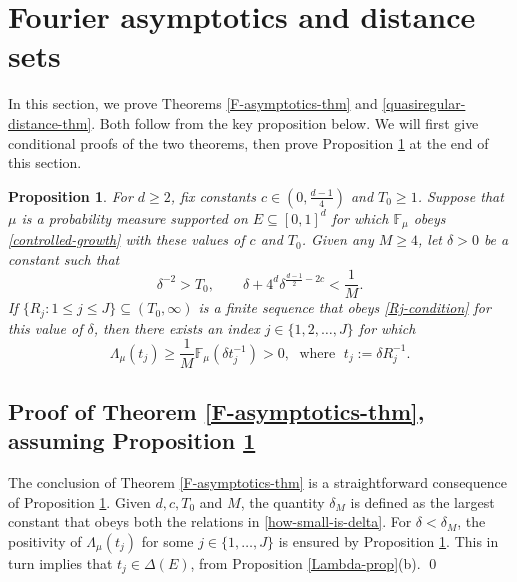 \documentclass[a4paper,11pt]{amsart}
\newtheorem{prop}[thm]{\bf Proposition}
\numberwithin{equation}{section}
\begin{document}
\section{Fourier asymptotics and distance sets} \label{F-asymptotics-section}
 In this section, we prove Theorems \ref{F-asymptotics-thm} and \ref{quasiregular-distance-thm}. Both follow from the key proposition below. We will first give conditional proofs of the two theorems, then prove Proposition \ref{F-asymptotics-prop} at the end of this section. 
\begin{prop} \label{F-asymptotics-prop} 
 For $d \geq 2$, fix constants $c \in (0, \frac{d-1}{4})$ and $T_0 \geq 1$. Suppose that $\mu$ is a probability measure supported on $E \subseteq [0,1]^d$ for which $\mathbb F_{\mu}$ obeys \eqref{controlled-growth} with these values of $c$ and $T_0$. Given any $M \geq 4$, let $\delta > 0$ be a constant such that 
\begin{equation} \label{how-small-is-delta} 
\delta^{-2} > T_0, \qquad \delta + 4^d \delta^{\frac{d-1}{2} - 2c} < \frac{1}{M}. 
\end{equation}  
If $\{R_j : 1 \leq j \leq J \} \subseteq (T_0, \infty)$ is a finite sequence that obeys \eqref{Rj-condition} for this value of $\delta$, then there exists an index $j \in \{1, 2, \ldots, J\}$  for which 
\begin{equation}
\Lambda_{\mu}(t_j) \geq \frac{1}{M} \mathbb F_{\mu}(\delta t_j^{-1}) > 0, \; \text{ where } \; t_j := \delta R_{j}^{-1}.  
\label{F-asymptotics-prop-conclusion} 
\end{equation}  
\end{prop} 
\subsection{Proof of Theorem \ref{F-asymptotics-thm}, assuming Proposition \ref{F-asymptotics-prop}}   
The conclusion of Theorem \ref{F-asymptotics-thm} is a straightforward consequence of Proposition \ref{F-asymptotics-prop}. Given $d, c, T_0$ and $M$, the quantity $\delta_M$ is defined as the largest constant that obeys both the relations in \eqref{how-small-is-delta}. For $\delta < \delta_M$, the positivity of $\Lambda_{\mu}(t_j)$ for some $j \in \{1, \ldots, J\}$ is ensured by Proposition \ref{F-asymptotics-prop}. This in turn implies that $t_j \in \Delta(E)$, from Proposition \ref{Lambda-prop}(b).    
\qed
\end{document}
